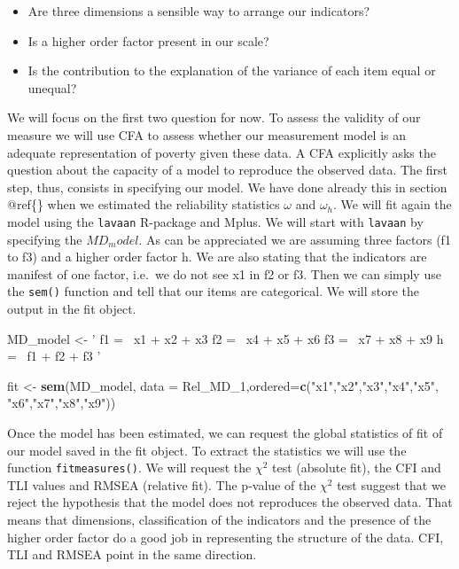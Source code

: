 \documentclass[]{book}
\newenvironment{Shaded}{\begin{snugshade}}{\end{snugshade}}
\newcommand{\DataTypeTok}[1]{\textcolor[rgb]{0.13,0.29,0.53}{#1}}
\newcommand{\DecValTok}[1]{\textcolor[rgb]{0.00,0.00,0.81}{#1}}
\newcommand{\KeywordTok}[1]{\textcolor[rgb]{0.13,0.29,0.53}{\textbf{#1}}}
\newcommand{\NormalTok}[1]{#1}
\newcommand{\StringTok}[1]{\textcolor[rgb]{0.31,0.60,0.02}{#1}}
\providecommand{\tightlist}{%
  \setlength{\itemsep}{0pt}\setlength{\parskip}{0pt}}
\begin{document}
\begin{itemize}
\tightlist
\item
  Are three dimensions a sensible way to arrange our indicators?
\item
  Is a higher order factor present in our scale?
\item
  Is the contribution to the explanation of the variance of each item equal or unequal?
\end{itemize}

We will focus on the first two question for now. To assess the validity of our measure we will use CFA to assess whether our measurement model is an adequate representation of poverty given these data. A CFA explicitly asks the question about the capacity of a model to reproduce the observed data. The first step, thus, consists in specifying our model. We have done already this in section @ref\{\} when we estimated the reliability statistics \(\omega\) and \(\omega_h\). We will fit again the model using the \texttt{lavaan} R-package and Mplus. We will start with \texttt{lavaan} by specifying the \(MD_model\). As can be appreciated we are assuming three factors (f1 to f3) and a higher order factor h. We are also stating that the indicators are manifest of one factor, i.e.~we do not see x1 in f2 or f3. Then we can simply use the \texttt{sem()} function and tell that our items are categorical. We will store the output in the fit object.

\begin{Shaded}
\begin{Highlighting}[]
\NormalTok{MD_model <-}\StringTok{ ' f1  =~ x1 + x2 + x3}
\StringTok{              f2 =~ x4 + x5 + x6}
\StringTok{              f3   =~ x7 + x8 + x9}
\StringTok{               h =~ f1 + f2 + f3}
\StringTok{'}

\NormalTok{fit <-}\StringTok{ }\KeywordTok{sem}\NormalTok{(MD_model,}
           \DataTypeTok{data =}\NormalTok{ Rel_MD_}\DecValTok{1}\NormalTok{,}\DataTypeTok{ordered=}\KeywordTok{c}\NormalTok{(}\StringTok{"x1"}\NormalTok{,}\StringTok{"x2"}\NormalTok{,}\StringTok{"x3"}\NormalTok{,}\StringTok{"x4"}\NormalTok{,}\StringTok{"x5"}\NormalTok{,}
                                     \StringTok{"x6"}\NormalTok{,}\StringTok{"x7"}\NormalTok{,}\StringTok{"x8"}\NormalTok{,}\StringTok{"x9"}\NormalTok{))}
\end{Highlighting}
\end{Shaded}

Once the model has been estimated, we can request the global statistics of fit of our model saved in the fit object. To extract the statistics we will use the function \texttt{fitmeasures()}. We will request the \(\chi^2\) test (absolute fit), the CFI and TLI values and RMSEA (relative fit). The p-value of the \(\chi^2\) test suggest that we reject the hypothesis that the model does not reproduces the observed data. That means that dimensions, classification of the indicators and the presence of the higher order factor do a good job in representing the structure of the data. CFI, TLI and RMSEA point in the same direction.
\end{document}
